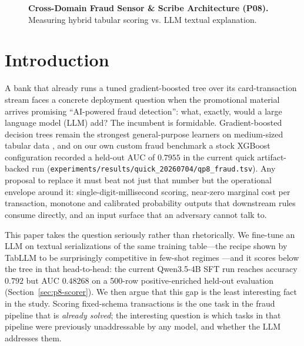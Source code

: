\documentclass{article}
\providecommand{\secref}[1]{Section~\ref{#1}}
\begin{document}
\begin{figure}[htbp]
\centering
{}
\caption{\textbf{Cross-Domain Fraud Sensor \& Scribe Architecture (P08).} Measuring hybrid tabular scoring vs. LLM textual explanation.}
\label{fig:p8_fraud_architecture}
\end{figure}
\section{Introduction}
\label{sec:p8-intro}

A bank that already runs a tuned gradient-boosted tree over its card-transaction
stream faces a concrete deployment question when the promotional material arrives
promising ``AI-powered fraud detection'': what, exactly, would a large language
model (LLM) add? The incumbent is formidable. Gradient-boosted decision trees
remain the strongest general-purpose learners on medium-sized tabular data
\citep{grinsztajn2022tree, shwartzziv2021tabular}, and on our own custom fraud
benchmark a stock XGBoost \citep{chen2016xgboost} configuration recorded a
held-out AUC of $0.7955$ in the current quick artifact-backed run
(\texttt{experiments/results/quick\_20260704/qp8\_fraud.tsv}). Any
proposal to replace it must beat not just that number but the operational
envelope around it: single-digit-millisecond scoring, near-zero marginal cost
per transaction, monotone and calibrated probability outputs that downstream
rules consume directly, and an input surface that an adversary cannot talk to.

This paper takes the question seriously rather than rhetorically. We fine-tune
an LLM on textual serializations of the same training table---the recipe shown
by TabLLM to be surprisingly competitive in few-shot regimes
\citep{hegselmann2023tabllm}---and it scores below the tree in that
head-to-head: the current Qwen3.5-4B SFT run reaches accuracy $0.792$ but AUC
$0.48268$ on a 500-row positive-enriched held-out evaluation
(\secref{sec:p8-scorer}). We then argue
that this gap is the least interesting fact in the study. Scoring
fixed-schema transactions is the one task in the fraud pipeline that is
\emph{already solved}; the interesting question is which tasks in that pipeline
were previously unaddressable by any model, and whether the LLM addresses them.
\end{document}

